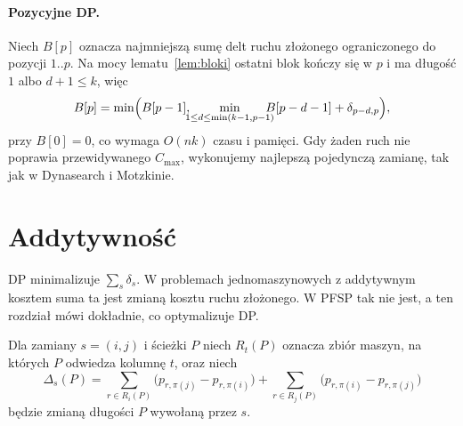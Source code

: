 \documentclass[letterpaper]{article} %
\theoremstyle{definition}
\begin{document}
\paragraph{Pozycyjne DP.} Niech $B[p]$ oznacza najmniejszą sumę delt
ruchu złożonego ograniczonego do pozycji $1..p$. Na mocy
lematu~\ref{lem:bloki} ostatni blok kończy się w $p$ i ma długość $1$
albo $d+1\leq k$, więc
\begin{equation}
B[p]=\min\Bigl(B[p-1],\ \hspace*{-3mm}\min_{1\le d\le \min(k-1,p-1)}\hspace*{-3mm} B[p-d-1]+\delta_{p-d,p}\Bigr),
\end{equation}
przy $B[0]=0$, co wymaga $O(nk)$ czasu i pamięci. Gdy żaden ruch nie
poprawia przewidywanego $C_{\max}$, wykonujemy najlepszą pojedynczą
zamianę, tak jak w Dynasearch i Motzkinie.

\section{Addytywność}\label{sec:addytywnosc}
DP minimalizuje $\sum_s\delta_s$. W problemach jednomaszynowych
z addytywnym kosztem suma ta jest zmianą kosztu ruchu złożonego. W PFSP
tak nie jest, a ten rozdział mówi dokładnie, co optymalizuje DP.

Dla zamiany $s=(i,j)$ i ścieżki $P$ niech $R_t(P)$ oznacza zbiór maszyn,
na których $P$ odwiedza kolumnę $t$, oraz niech
\begin{equation}\label{eq:delta-sciezki}
\Delta_s(P)=\!\!\sum_{r\in R_i(P)}\!\!\bigl(p_{r,\pi(j)}-p_{r,\pi(i)}\bigr)
+\!\!\sum_{r\in R_j(P)}\!\!\bigl(p_{r,\pi(i)}-p_{r,\pi(j)}\bigr)
\end{equation}
będzie zmianą długości $P$ wywołaną przez $s$.
\end{document}
